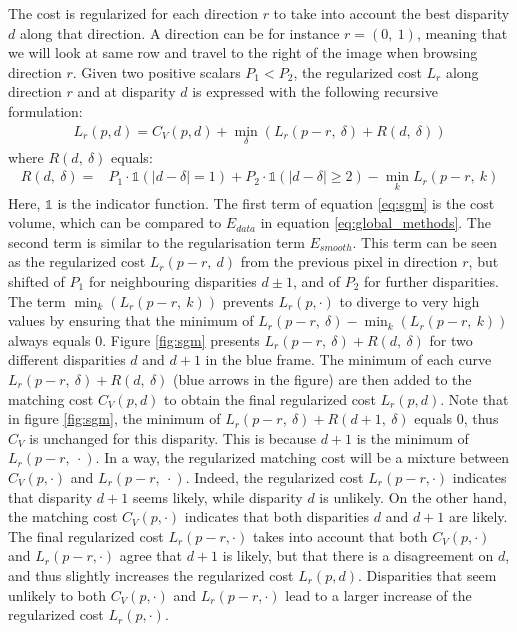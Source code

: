 The cost is regularized for each direction $r$ to take into account the best disparity $d$ along that direction. A direction can be for instance $r=(0,~1)$, meaning that we will look at same row and travel to the right of the image when browsing direction $r$. Given two positive scalars $P_1<P_2$, the regularized cost $L_r$ along direction $r$ and at disparity $d$ is expressed with the following recursive formulation:
\begin{align}\label{eq:sgm}
    L_r(p,d) = C_V(p,d) + \min_\delta \left(L_r(p-r,~\delta) + R(d, ~\delta)\right)
\end{align}
where $R(d, ~\delta)$ equals:
\begin{align}
    R(d, ~\delta) = &P_1\cdot\mathds{1}(|d-\delta|=1) + P_2\cdot\mathds{1}(|d-\delta|\geqslant 2) - \min_k L_r(p-r,~k) \label{eq:sgm_penalties}
\end{align}
Here, $\mathds{1}$ is the indicator function. The first term of equation \eqref{eq:sgm} is the cost volume, which can be compared to $E_{data}$ in equation \eqref{eq:global_methods}. The second term is similar to the regularisation term $E_{smooth}$. This term can be seen as the regularized cost $L_r(p-r, ~d)$ from the previous pixel in direction $r$, but shifted of $P_1$ for neighbouring disparities $d\pm1$, and of $P_2$ for further disparities. The term $\min_k(L_r(p-r,~k))$ prevents $L_r(p,\cdot)$ to diverge to very high values by ensuring that the minimum of $L_r(p-r,~\delta) - \min_k(L_r(p-r,~k))$ always equals $0$. Figure \ref{fig:sgm} presents $L_r(p-r,~\delta) + R(d, ~\delta)$ for two different disparities $d$ and $d+1$ in the blue frame. The minimum of each curve $L_r(p-r,~\delta) + R(d, ~\delta)$ (blue arrows in the figure) are then added to the matching cost $C_V(p,d)$ to obtain the final regularized cost $L_r(p,d)$. Note that in figure \ref{fig:sgm}, the minimum of $L_r(p-r,~\delta)+R(d+1, ~\delta)$ equals $0$, thus $C_V$ is unchanged for this disparity. This is because $d+1$ is the minimum of $L_r(p-r,~\cdot)$. In a way, the regularized matching cost will be a mixture between $C_V(p,\cdot)$ and $L_r(p-r,~\cdot)$. Indeed, the regularized cost $L_r(p-r,\cdot)$ indicates that disparity $d+1$ seems likely, while disparity $d$ is unlikely. On the other hand, the matching cost $C_V(p,\cdot)$ indicates that both disparities $d$ and $d+1$ are likely. The final regularized cost $L_r(p-r,\cdot)$ takes into account that both $C_V(p,\cdot)$ and $L_r(p-r,\cdot)$ agree that $d+1$ is likely, but that there is a disagreement on $d$, and thus slightly increases the regularized cost $L_r(p,d)$. Disparities that seem unlikely to both $C_V(p,\cdot)$ and $L_r(p-r,\cdot)$ lead to a larger increase of the regularized cost $L_r(p,\cdot)$.
